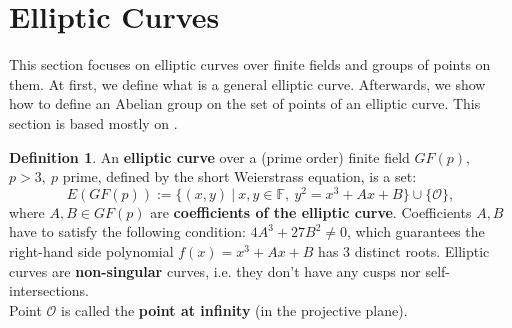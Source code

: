 \documentclass[thesis=M,english]{FITthesis}[2012/10/20]
\theoremstyle{remark}
\theoremstyle{definition}
\newtheorem{DF}{Definition}[section]
\begin{document}
\section{Elliptic Curves}
This section focuses on elliptic curves over finite fields and groups of points on them. At first, we define what is a general elliptic curve. Afterwards, we show how to define an Abelian group on the set of points of an elliptic curve. This section is based mostly on \cite{mky}.
\begin{DF}
An \textbf{elliptic curve} over a (prime order) finite field $GF(p),$ \\ $p > 3,\ p$ prime, defined by the short Weierstrass equation, is a set:
$$
E(GF(p)) := \{(x,y)\ |\ x,y \in \mathbb{F},\ y^2 = x^3 + Ax+B\} \cup \{ \mathcal{O} \},
$$
where $A, B \in GF(p)$ are \textbf{coefficients of the elliptic curve}. Coefficients $A,B$ have to satisfy the following condition: $4A^3 + 27B^2 \neq 0$, which guarantees the right-hand side polynomial $f(x)=x^3 + Ax+B$ has 3 distinct roots. Elliptic curves are \textbf{non-singular} curves, i.e. they don't have any cusps nor self-intersections. \\
\noindent Point $\mathcal{O}$ is called the \textbf{point at infinity} (in the projective plane).
\end{DF}
\end{document}
